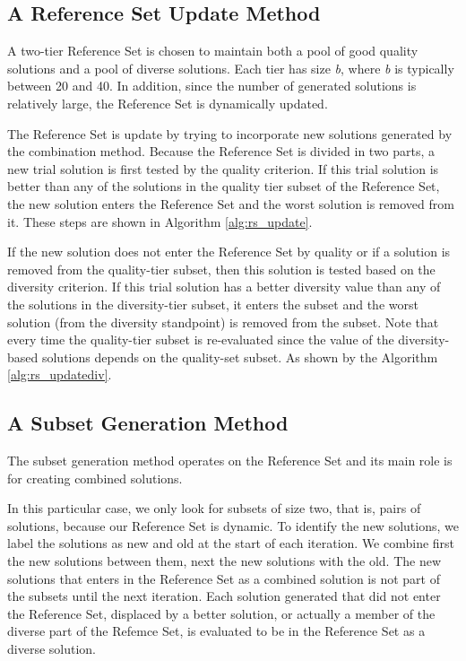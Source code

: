 \subsection{A Reference Set Update Method}
A two-tier Reference Set
is chosen to maintain both
a pool of good quality solutions
and a pool of diverse solutions.
Each tier has size \textit{b},
where \textit{b}
is typically between 20 and 40.
In addition,
since the number of generated solutions
is relatively large,
the Reference Set is dynamically updated.

The Reference Set is update
by trying to incorporate new solutions
generated by the combination method.
Because the Reference Set is divided
in two parts,
a new trial solution
is first tested by the quality criterion.
If this trial solution
is better
than any of the solutions
in the quality tier subset
of the Reference Set,
the new solution enters the Reference Set
and the worst solution
is removed from it.
These steps are shown in Algorithm \ref{alg:rs_update}.


If the new solution
does not enter the Reference Set by quality
or if a solution is removed
from the quality-tier subset,
then this solution is tested
based on the diversity criterion.
If this trial solution
has a better diversity value than any of the solutions
in the diversity-tier subset,
it enters the subset and the worst solution
(from the diversity standpoint)
is removed from the subset.
Note that every time
the quality-tier subset is re-evaluated
since the value of the diversity-based solutions
depends on the quality-set subset.
As shown by the Algorithm \ref{alg:rs_updatediv}.


\subsection{A Subset Generation Method}
The subset generation method
operates on the Reference Set
and its main role is
for creating combined solutions.

In this particular case,
we only look for subsets of size two,
that is,
pairs of solutions,
because our Reference Set is dynamic.
To identify the new solutions,
we label the solutions as new and old
at the start of each iteration.
We combine first
the new solutions between them,
next
the new solutions with the old.
The new solutions that enters in the Reference Set
as a combined solution
is not part of the subsets
until the next iteration.
Each solution generated
that did not enter the Reference Set,
displaced by a better solution,
or actually
a member of the diverse part of the Refemce Set,
is evaluated to be in the Reference Set
as a diverse solution.

